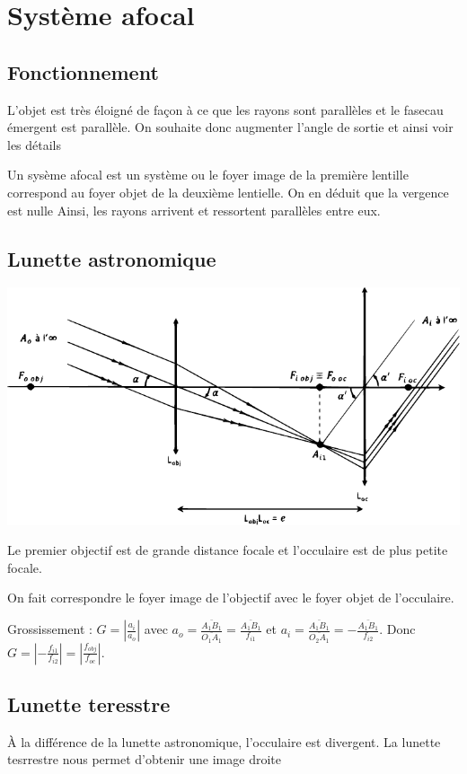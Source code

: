 \documentclass[french]{yLectureNote}
\begin{document}
\section{Système afocal}
\subsection{Fonctionnement}
L'objet est très éloigné de façon à ce que les rayons sont parallèles et le fasecau émergent est parallèle. On souhaite donc augmenter l'angle de sortie et ainsi voir les détails
\begin{definition}
Un sysème afocal est un système ou le foyer image de la première lentille correspond au foyer objet de la deuxième lentielle. On en déduit que la vergence est nulle Ainsi, les rayons arrivent et ressortent parallèles entre eux.
\end{definition}

\subsection{Lunette astronomique}
\includegraphics[scale=0.5]{lunette}

Le premier objectif est de grande distance focale et l'occulaire est de plus petite focale.

On fait correspondre le foyer image de l'objectif avec le foyer objet de l'occulaire.
\begin{theorem}[Caractéristiques]
 Grossissement  : \(G = |\frac{a_i}{a_o}|\) avec \(a_o = \frac{\bar{A_1B_1}}{\bar{O_1A_1}} = \frac{\bar{A_1B_1}}{f_{i1}}\) et \(a_i = \frac{\bar{A_1B_1}}{\bar{O_2A_1}} = -\frac{\bar{A_1B_1}}{f_{i2}}\). Donc \(G = |-\frac{f_{i1}}{f_{i2}}| = |\frac{f_{obj}}{f_{oc}}|\).%
\end{theorem}

\subsection{Lunette teresstre}
À la différence de la lunette astronomique, l'occulaire est divergent. La lunette tesrrestre nous permet d'obtenir une image droite
\end{document}
